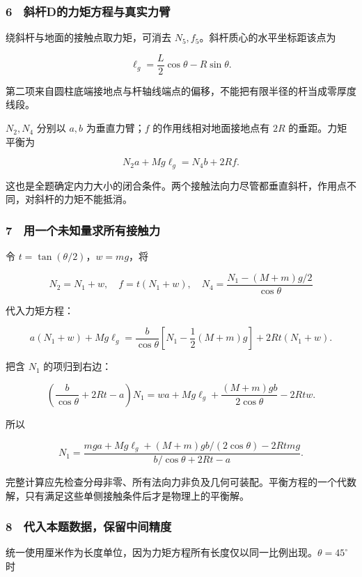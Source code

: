 \documentclass[12pt,a4paper,fontset=fandol]{ctexart}
\begin{document}
\subsubsection{6　斜杆D的力矩方程与真实力臂}\label{ux659cux6746dux7684ux529bux77e9ux65b9ux7a0bux4e0eux771fux5b9eux529bux81c2}

绕斜杆与地面的接触点取力矩，可消去
\(N_5,f_5\)。斜杆质心的水平坐标距该点为

\[\ell_g=\frac L2\cos\theta-R\sin\theta.\]

第二项来自圆柱底端接地点与杆轴线端点的偏移，不能把有限半径的杆当成零厚度线段。

\(N_2,N_4\) 分别以 \(a,b\) 为垂直力臂；\(f\) 的作用线相对地面接地点有
\(2R\) 的垂距。力矩平衡为

\[\boxed{N_2a+Mg\ell_g=N_4b+2Rf.}\]

这也是全题确定内力大小的闭合条件。两个接触法向力尽管都垂直斜杆，作用点不同，对斜杆的力矩不能抵消。

\subsubsection{7　用一个未知量求所有接触力}\label{ux7528ux4e00ux4e2aux672aux77e5ux91cfux6c42ux6240ux6709ux63a5ux89e6ux529b}

令 \(t=\tan(\theta/2)\)，\(w=mg\)，将

\[N_2=N_1+w,\quad f=t(N_1+w),\quad
N_4=\frac{N_1-(M+m)g/2}{\cos\theta}\]

代入力矩方程：

\[a(N_1+w)+Mg\ell_g
=\frac b{\cos\theta}\left[N_1-\frac12(M+m)g\right]
+2Rt(N_1+w).\]

把含 \(N_1\) 的项归到右边：

\[\left(\frac b{\cos\theta}+2Rt-a\right)N_1
=wa+Mg\ell_g+\frac{(M+m)gb}{2\cos\theta}-2Rtw.\]

所以

\[\boxed{N_1=
\frac{mga+Mg\ell_g+(M+m)gb/(2\cos\theta)-2Rtm g}
{b/\cos\theta+2Rt-a}.}\]

完整计算应先检查分母非零、所有法向力非负及几何可装配。平衡方程的一个代数解，只有满足这些单侧接触条件后才是物理上的平衡解。

\subsubsection{8　代入本题数据，保留中间精度}\label{ux4ee3ux5165ux672cux9898ux6570ux636eux4fddux7559ux4e2dux95f4ux7cbeux5ea6}

统一使用厘米作为长度单位，因为力矩方程所有长度仅以同一比例出现。\(\theta=45^\circ\)
时
\end{document}
